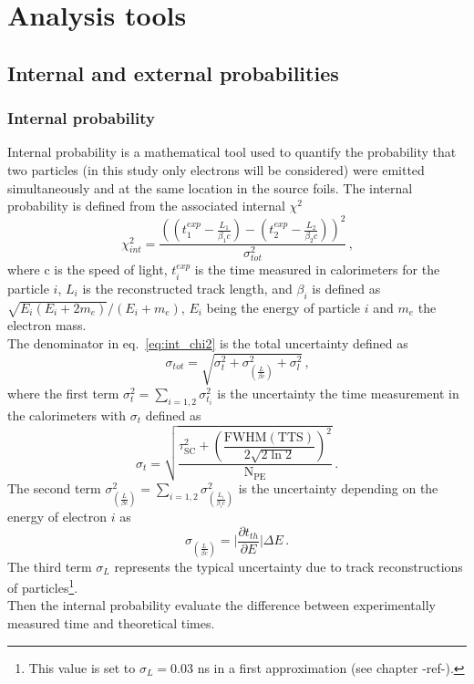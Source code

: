 \chapter{Analysis tools}

\section{Internal and external probabilities}
\subsection{Internal probability}
\label{subsec:internal_prob}
Internal probability is a mathematical tool used to quantify the probability that two particles (in this study only electrons will be considered) were emitted simultaneously and at the same location in the source foils.
The internal probability is defined from the associated internal $\chi^{2}$
\begin{equation}
  \chi^{2}_{int}=\frac{((t^{exp}_{1} - \frac{L_{1}}{\beta_{1} c}) - (t^{exp}_{2} - \frac{L_{2}}{\beta_{2} c}))^{2}}{\sigma_{tot}^{2}}\,\text{,}
  \label{eq:int_chi2}
\end{equation}
where c is the speed of light, $t^{exp}_{i}$ is the time measured in calorimeters for the particle $i$, $L_{i}$ is the reconstructed track length, and $\beta_{i}$ is defined as $\sqrt{E_{i}(E_{i} + 2m_{e})} / (E_{i} + m_{e})$, $E_{i}$ being the energy of particle $i$ and $m_{e}$ the electron mass.\\
The denominator in eq.~\ref{eq:int_chi2} is the total uncertainty defined as
\begin{equation}
  \sigma_{tot}=\sqrt{\sigma_{t}^{2}+\sigma_{\left(\frac{L}{\beta c}\right)}^{2}+\sigma_{l}^{2}}\,\text{,}
  \label{eq:sigma_tot}
\end{equation}
where the first term $\sigma^{2}_{t}=\sum_{i=1,2}\sigma^{2}_{t_{i}}$ is the uncertainty the time measurement in the calorimeters with $\sigma_{t}$ defined as
\begin{equation}
  \sigma_{t}=\sqrt{\dfrac{\tau_{\text{SC}}^{2}+\left(\dfrac{\text{FWHM}(\text{TTS})}{2\sqrt{2\ln{2}}}\right)^{2}}{\text{N}_\text{PE}}}\,\text{.}
  \label{eq:sigma_t}
\end{equation}
The second term $\sigma^{2}_{\left(\frac{L}{\beta c}\right)}=\sum_{i=1,2}\sigma^{2}_{\left(\frac{L_{i}}{\beta_{i}c}\right)}$ is the uncertainty depending on the energy of electron $i$ as
\begin{equation}
\sigma_{\left(\frac{L}{\beta c}\right)} = \biggl\lvert \dfrac{\partial t_{th}}{\partial E}  \biggr\rvert \Delta E\,\text{.}
  \label{eq:sigma_L}
\end{equation}
The third term $\sigma_{L}$ represents the typical uncertainty due to track reconstructions of particles\footnote{This value is set to $\sigma_{L}=0.03$ ns in a first approximation (see chapter -ref-).}.\\
Then the internal probability evaluate the difference between experimentally measured time and theoretical times.




